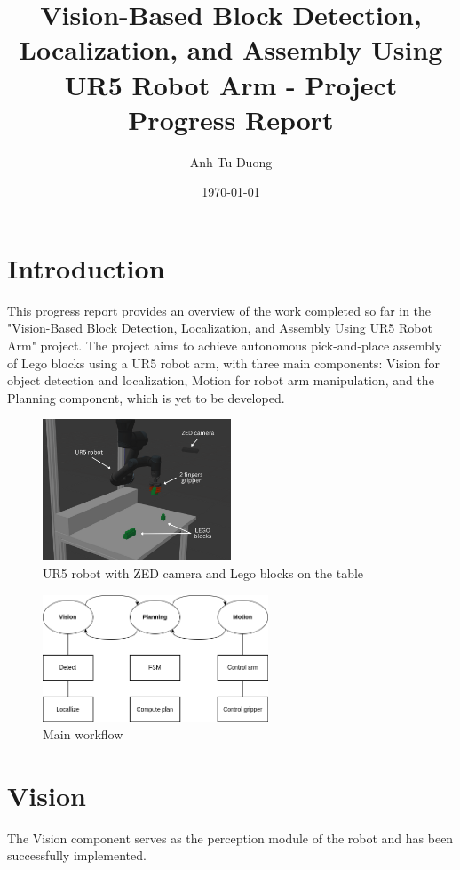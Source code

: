 \documentclass{article}
\title{Vision-Based Block Detection, Localization, and Assembly Using UR5 Robot Arm - Project Progress Report}
\author{Anh Tu Duong}
\date{\today}
\begin{document}
	
	\maketitle
	
	\section{Introduction}
	This progress report provides an overview of the work completed so far in the "Vision-Based Block Detection, Localization, and Assembly Using UR5 Robot Arm" project. The project aims to achieve autonomous pick-and-place assembly of Lego blocks using a UR5 robot arm, with three main components: Vision for object detection and localization, Motion for robot arm manipulation, and the Planning component, which is yet to be developed.
	
	\begin{figure}[H]
		\centering
		\includegraphics[width=0.5\textwidth]{scene-start.png}
		\caption{UR5 robot with ZED camera and Lego blocks on the table}
		\label{fig:scene-start}
	\end{figure}
	
	\begin{figure}[H]
		\centering
		\includegraphics[width=0.6\textwidth]{design-main.png}
		\caption{Main workflow}
		\label{fig:design-main}
	\end{figure}
	
	\section{Vision}
	The Vision component serves as the perception module of the robot and has been successfully implemented.
	
\end{document}
